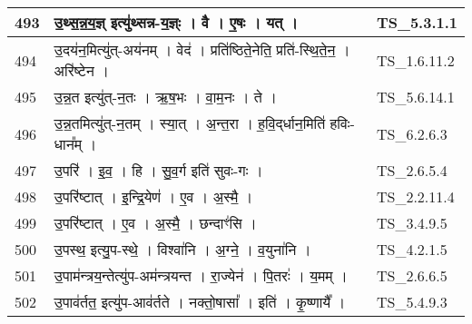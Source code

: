 \documentclass[17pt]{extarticle}
\begin{document}
\begin{longtable}{||p{0.4in}||p{4.9in}||p{0.9in}||}
    \hline
        
    493 & उ॒थ्स॒न्न॒य॒ज्ञ् इत्यु॑थ्सन्न{-}य॒ज्ञ्ः   ।   वै   ।   ए॒षः   ।   यत्   ।    & TS\_5.3.1.1       \\
    
    \hline
        
    494 & उ॒दय॑न॒मित्यु॑त्{-}अय॑नम्   ।   वेद॑   ।   प्रति॑ष्ठिते॒नेति॒ प्रति॑{-}स्थि॒ते॒न॒   ।   अरि॑ष्टेन   ।    & TS\_1.6.11.2       \\
    
    \hline
        
    495 & उ॒न्न॒त इत्यु॑त्{-}न॒तः   ।   ऋ॒ष॒भः   ।   वा॒म॒नः   ।   ते   ।    & TS\_5.6.14.1       \\
    
    \hline
        
    496 & उ॒न्न॒तमित्यु॑त्{-}न॒तम्   ।   स्या॒त्   ।   अ॒न्त॒रा   ।   ह॒वि॒द्‌र्धान॒मिति॑ हविः{-}धान᳚म्   ।    & TS\_6.2.6.3       \\
    
    \hline
        
    497 & उ॒परि॑   ।   इ॒व॒   ।   हि   ।   सु॒व॒र्ग इति॑ सुवः{-}गः   ।    & TS\_2.6.5.4       \\
    
    \hline
        
    498 & उ॒परि॑ष्टात्   ।   इ॒न्द्रि॒येण॑   ।   ए॒व   ।   अ॒स्मै॒   ।    & TS\_2.2.11.4       \\
    
    \hline
        
    499 & उ॒परि॑ष्टात्   ।   ए॒व   ।   अ॒स्मै॒   ।   छन्दाꣳ॑सि   ।    & TS\_3.4.9.5       \\
    
    \hline
        
    500 & उ॒पस्थ॒ इत्यु॒प{-}स्थे॒   ।   विश्वा॑नि   ।   अ॒ग्ने॒   ।   व॒युना॑नि   ।    & TS\_4.2.1.5       \\
    
    \hline
        
    501 & उ॒पाम॑न्त्रय॒न्तेत्यु॑प{-}अम॑न्त्रयन्त   ।   रा॒ज्येन॑   ।   पि॒तरः॑   ।   य॒मम्   ।    & TS\_2.6.6.5       \\
    
    \hline
        
    502 & उ॒पाव॑र्तत॒ इत्यु॑प{-}आव॑र्तते   ।   नक्तो॒षासा᳚   ।   इति॑   ।   कृ॒ष्णायै᳚   ।    & TS\_5.4.9.3       \\
    
    \hline
        

\end{longtable}
\end{document}

